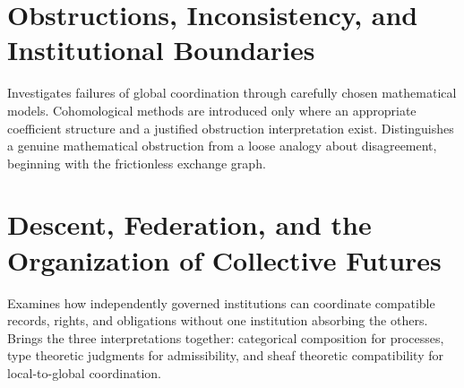 \chapter{Obstructions, Inconsistency, and Institutional Boundaries}\label{ch:59}
Investigates failures of global coordination through carefully chosen mathematical models. Cohomological methods are introduced only where an appropriate coefficient structure and a justified obstruction interpretation exist. Distinguishes a genuine mathematical obstruction from a loose analogy about disagreement, beginning with the frictionless exchange graph.
\scaffold

\chapter{Descent, Federation, and the Organization of Collective Futures}\label{ch:60}
Examines how independently governed institutions can coordinate compatible records, rights, and obligations without one institution absorbing the others. Brings the three interpretations together: categorical composition for processes, type theoretic judgments for admissibility, and sheaf theoretic compatibility for local-to-global coordination.
\scaffold
